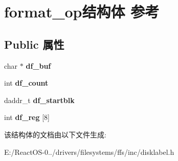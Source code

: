 \hypertarget{structformat__op}{}\section{format\+\_\+op结构体 参考}
\label{structformat__op}
\subsection*{Public 属性}
\begin{DoxyCompactItemize}
\item 
\mbox{\label{structformat__op_a8bdd9cdea235fc3831ce20a684d50f32}} 
char $\ast$ {\bfseries df\+\_\+buf}
\item 
\mbox{\label{structformat__op_a624c6726435d925348c6eff6a578ccb3}} 
int {\bfseries df\+\_\+count}
\item 
\mbox{\label{structformat__op_aef2fdc87a79d318e078e59e8ad522bb5}} 
daddr\+\_\+t {\bfseries df\+\_\+startblk}
\item 
\mbox{\label{structformat__op_a69cb13ee4d4416b9c252272adb623ca9}} 
int {\bfseries df\+\_\+reg} \mbox{[}8\mbox{]}
\end{DoxyCompactItemize}


该结构体的文档由以下文件生成\+:\begin{DoxyCompactItemize}
\item 
E\+:/\+React\+O\+S-\/0../drivers/filesystems/ffs/inc/disklabel.\+h\end{DoxyCompactItemize}
